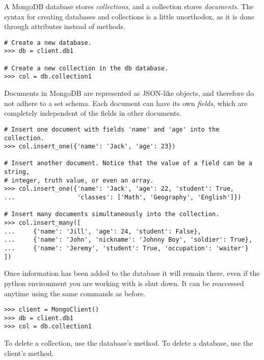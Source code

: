 A MongoDB database stores \emph{collections}, and a collection stores \emph{documents}.
The syntax for creating databases and collections is a little unorthodox, as it is done through attributes instead of methods.

\begin{lstlisting}
# Create a new database.
>>> db = client.db1

# Create a new collection in the db database.
>>> col = db.collection1
\end{lstlisting}

Documents in MongoDB are represented as JSON-like objects, and therefore do not adhere to a set schema.
Each document can have its own \emph{fields}, which are completely independent of the fields in other documents.

\begin{lstlisting}
# Insert one document with fields 'name' and 'age' into the collection.
>>> col.insert_one({'name': 'Jack', 'age': 23})

# Insert another document. Notice that the value of a field can be a string,
# integer, truth value, or even an array.
>>> col.insert_one({'name': 'Jack', 'age': 22, 'student': True,
...                 'classes': ['Math', 'Geography', 'English']})

# Insert many documents simultaneously into the collection.
>>> col.insert_many([
...     {'name': 'Jill', 'age': 24, 'student': False},
...     {'name': 'John', 'nickname': 'Johnny Boy', 'soldier': True},
...     {'name': 'Jeremy', 'student': True, 'occupation': 'waiter'}  ])
\end{lstlisting}

\begin{info}
Once information has been added to the database it will remain there, even if the python environment you are working with is shut down.
It can be reaccessed anytime using the same commands as before.

\begin{lstlisting}
>>> client = MongoClient()
>>> db = client.db1
>>> col = db.collection1
\end{lstlisting}

To delete a collection, use the database's  method.
To delete a database, use the client's  method.
\end{info}

